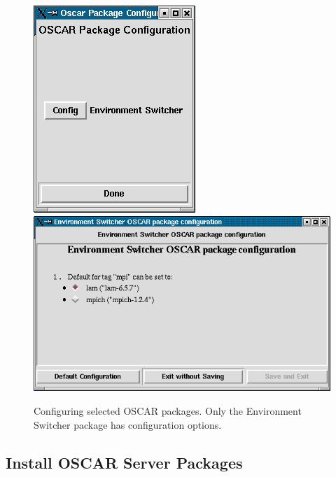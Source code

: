\begin{figure}[ht!]
  \begin{center}
    \centerline{
      \includegraphics[scale=\imgscale]{figs/package-configuration}
      \hspace{\imghskip}
      \includegraphics[scale=\imgscale]{figs/package-configuration-switcher}
    }
    \caption{Configuring selected OSCAR packages.  Only the
      Environment Switcher package has configuration options.}
    \label{fig:sbs-package-configuration}
  \end{center}
\end{figure}


\subsection{Install OSCAR Server Packages}

